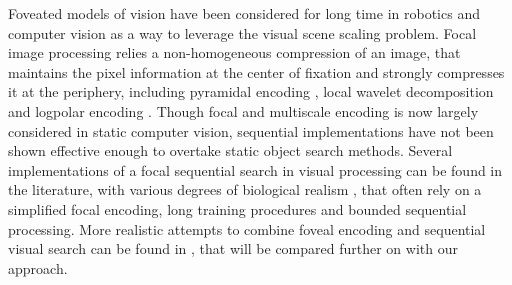 Foveated models of vision have been considered for long time in robotics and computer vision as a way to leverage the visual scene scaling problem. Focal image processing relies a non-homogeneous compression of an image, that maintains the pixel information at the center of fixation and strongly compresses it at the periphery, including pyramidal encoding \cite{kortum1996implementation,Butko2010infomax}, local wavelet decomposition \cite{dauce2018active} and logpolar encoding \cite{fischer2007self,Traver10}. Though focal and multiscale encoding is now largely considered in static computer vision, sequential implementations have not been shown effective enough to overtake static object search methods. Several implementations of a focal sequential search in visual processing can be found in the literature, with various degrees of biological realism \cite{mnih2014recurrent,fu2017look}, that often rely on a simplified focal encoding, long training procedures and bounded sequential processing. More realistic attempts to combine foveal encoding and sequential visual search can be found in \cite{Butko2010infomax,denil2012learning,dauce2018active}, that will be compared further on with our approach.


